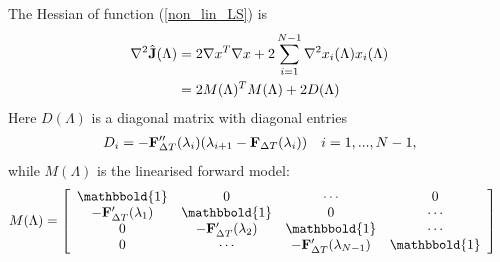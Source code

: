 \begin{proposition}\label{NonLin_prop}
The Hessian of function (\ref{non_lin_LS}) is
\begin{align*}
\nabla^2 \hat{\bold J}(\Lambda) &= 2\nabla x^T\nabla x + 2\sum_{i=1}^{N-1} \nabla^2 x_i(\Lambda) x_i(\Lambda)\\
&=2M(\Lambda)^TM(\Lambda) + 2D(\Lambda)
\end{align*}
Here $D(\Lambda)$ is a diagonal matrix with diagonal entries 
\begin{align*}
D_i=-\bold{F}_{\Delta T}''(\lambda_i)(\lambda_{i+1}-\bold F_{\Delta T}(\lambda_i)) \quad i=1,...,N-1,
\end{align*}
while $M(\Lambda)$ is the linearised forward model:
\begin{align*}
M(\Lambda) &= \left[ \begin{array}{cccc}
   \mathbbold{1} & 0 & \cdots & 0 \\  
   -\bold{F}_{\Delta T}'(\lambda_{1}) & \mathbbold{1} & 0 & \cdots \\ 
   0 &-\bold{F}_{\Delta T}'(\lambda_{2}) & \mathbbold{1}  & \cdots \\
   0 &\cdots &-\bold{F}_{\Delta T}'(\lambda_{N-1}) & \mathbbold{1}  \\
   \end{array}  \right]
\end{align*}	
\end{proposition}
